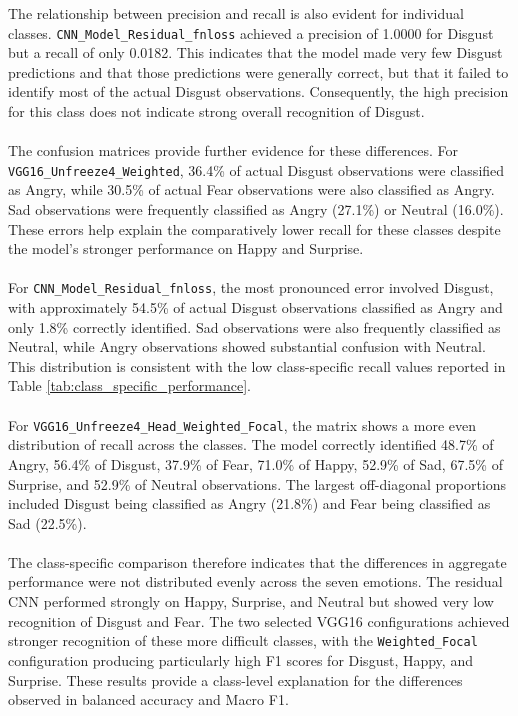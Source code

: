 \documentclass[12pt, a4paper]{report}
\begin{document}
				The relationship between precision and recall is also evident for individual classes. \texttt{CNN\_Model\_Residual\_fnloss} achieved a precision of 1.0000 for Disgust but a recall of only 0.0182. This indicates that the model made very few Disgust predictions and that those predictions were generally correct, but that it failed to identify most of the actual Disgust observations. Consequently, the high precision for this class does not indicate strong overall recognition of Disgust.\\\\
				The confusion matrices provide further evidence for these differences. For \\\texttt{VGG16\_Unfreeze4\_Weighted}, 36.4\% of actual Disgust observations were classified as Angry, while 30.5\% of actual Fear observations were also classified as Angry. Sad observations were frequently classified as Angry (27.1\%) or Neutral (16.0\%). These errors help explain the comparatively lower recall for these classes despite the model's stronger performance on Happy and Surprise.\\\\
				For \texttt{CNN\_Model\_Residual\_fnloss}, the most pronounced error involved Disgust, with approximately 54.5\% of actual Disgust observations classified as Angry and only 1.8\% correctly identified. Sad observations were also frequently classified as Neutral, while Angry observations showed substantial confusion with Neutral. This distribution is consistent with the low class-specific recall values reported in Table \ref{tab:class_specific_performance}.\\\\
				For \texttt{VGG16\_Unfreeze4\_Head\_Weighted\_Focal}, the matrix shows a more even distribution of recall across the classes. The model correctly identified 48.7\% of Angry, 56.4\% of Disgust, 37.9\% of Fear, 71.0\% of Happy, 52.9\% of Sad, 67.5\% of Surprise, and 52.9\% of Neutral observations. The largest off-diagonal proportions included Disgust being classified as Angry (21.8\%) and Fear being classified as Sad (22.5\%).\\\\
				The class-specific comparison therefore indicates that the differences in aggregate performance were not distributed evenly across the seven emotions. The residual CNN performed strongly on Happy, Surprise, and Neutral but showed very low recognition of Disgust and Fear. The two selected VGG16 configurations achieved stronger recognition of these more difficult classes, with the \texttt{Weighted\_Focal} configuration producing particularly high F1 scores for Disgust, Happy, and Surprise. These results provide a class-level explanation for the differences observed in balanced accuracy and Macro F1.\\\\
\end{document}
